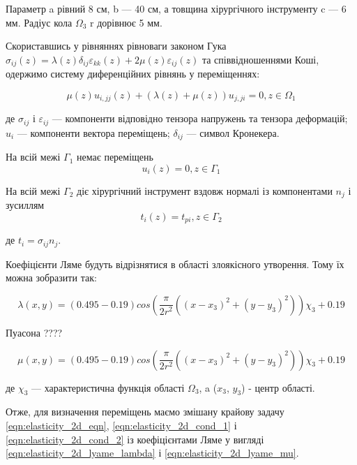 \noindent Параметр a рівний 8 см, b --- 40 см, а товщина хірургічного інструменту c --- 6 мм. Радіус кола $\Omega_3$ r 
дорівнює 5 мм.

Скориставшись у рівняннях рівноваги законом Гука 
$\sigma_{ij}(z) = \lambda(z)\delta_{ij}\varepsilon_{kk}(z) + 2\mu(z)\varepsilon_{ij}(z)$ та співвідношеннями Коші, 
одержимо систему диференційних рівнянь у переміщеннях:

\begin{equation}
    \label{eqn:elasticity_2d_eqn}
    \mu(z)u_{i,jj}(z) + (\lambda(z) + \mu(z))u_{j,ji} = 0, z \in \Omega_1
\end{equation}

\noindent де $\sigma_{ij}$ і $\varepsilon_{ij}$ --- компоненти відповідно тензора напружень та тензора деформацій; $u_i$
--- компоненти вектора переміщень; $\delta_{ij}$ --- символ Кронекера.

\noindent На всій межі $\Gamma_1$ немає переміщень
\begin{equation}
    \label{eqn:elasticity_2d_cond_1}
    u_i(z) = 0, z \in \Gamma_1
\end{equation}

\noindent На всій межі $\Gamma_2$ діє хірургічний інструмент вздовж нормалі із компонентами $n_j$ і зусиллям
\begin{equation}
    \label{eqn:elasticity_2d_cond_2}
    t_i(z) = t_{pi}, z \in \Gamma_2
\end{equation}

\noindent де $t_i = \sigma_{ij}n_j$.

Коефіцієнти Ляме будуть відрізнятися в області злоякісного утворення. Тому їх можна зобразити так:

\begin{equation}
    \label{eqn:elasticity_2d_lyame_lambda}
    \lambda(x, y) = (0.495 - 0.19)cos(\frac{\pi}{2r^2}((x - x_3)^2 + (y - y_3)^2))\chi_3 + 0.19
\end{equation}

{ Пуасона ????}

\begin{equation}
    \label{eqn:elasticity_2d_lyame_mu}
    \mu(x, y) = (0.495 - 0.19)cos(\frac{\pi}{2r^2}((x - x_3)^2 + (y - y_3)^2))\chi_3 + 0.19
\end{equation}

\noindent де $\chi_3$ --- характеристична функція області $\Omega_3$, a ($x_3$, $y_3$) - центр області.

Отже, для визначення переміщень маємо змішану крайову задачу \ref{eqn:elasticity_2d_eqn}, \ref{eqn:elasticity_2d_cond_1} 
і \ref{eqn:elasticity_2d_cond_2} із коефіцієнтами Ляме у вигляді \ref{eqn:elasticity_2d_lyame_lambda} і 
\ref{eqn:elasticity_2d_lyame_mu}.

